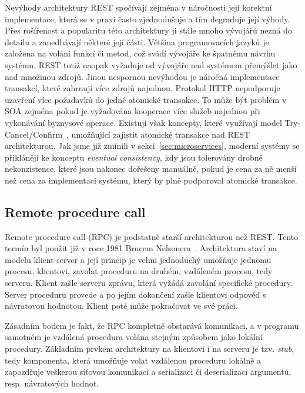 Nevýhody architektury \gls{REST} spočívají zejména v náročnosti její korektní implementace,
která se v praxi často zjednodušuje a tím degraduje její výhody. Přes rošířenost a popularitu
této architektury ji stále mnoho vývojářů nezná do detailu a zanedbávají některé její části.
Většina programovacích jazyků je založena na volání funkcí či metod, což svádí vývojáře ke
špatnému návrhu systému. \gls{REST} totiž naopak vyžaduje od vývojáře nad systémem přemýšlet jako
nad množinou zdrojů. Jinou nespornou nevýhodou je náročná implementace transakcí, které zahrnují více
zdrojů najednou. Protokol \gls{HTTP} nepodporuje uzavření více požadavků do jedné atomické
transakce. To může být problém v \gls{SOA} zejména pokud je vyžadována kooperace více služeb
najednou při vykonávání byznysové operace. Existují však koncepty, které využívají model
Try-Cancel/Confirm~\cite{pardon2011towards}, umožňující zajistit atomické transakce nad \gls{REST} architekturou.
Jak jsme již zmínili v sekci~\ref{sec:microservices}, moderní systémy se přiklánějí ke konceptu
\textit{eventual consistency}, kdy jsou tolerovány drobné nekonzistence, které jsou nakonec
dořešeny manuálně, pokud je cena za ně menší než cena za implementaci systému, který
by plně podporoval atomické transakce.

\subsection{Remote procedure call}\label{sec:rpc}

Remote procedure call (\gls{RPC}) je podstatně starší architekturou než \gls{REST}.
Tento termín byl použit již v roce 1981 Brucem Nelsonem~\cite{nelson1981remote}.
Architektura staví na modelu klient-server a její princip je velmi jednoduchý \textendash
umožňuje jednomu procesu, klientovi, zavolat proceduru na druhém, vzdáleném procesu, tedy serveru.
Klient zašle serveru zprávu, která vyžádá zavolání specifické procedury. Server
proceduru provede a po jejím dokončení zašle klientovi odpověď s návratovou hodnotou.
Klient poté může pokračovat ve své práci.

Zásadním bodem je fakt, že \gls{RPC} kompletně obstarává komunikaci, a v programu samotném
je vzdálená procedura volána stejným způsobem jako lokální procedury. Základním
prvkem architektury na klientovi i na serveru je tzv. \textit{stub}, tedy komponenta, která
umožňuje volat vzdálenou proceduru lokálně a zapozdřuje veškerou síťovou komunikaci
a serializaci či deserializaci argumentů, resp. návratových hodnot.

